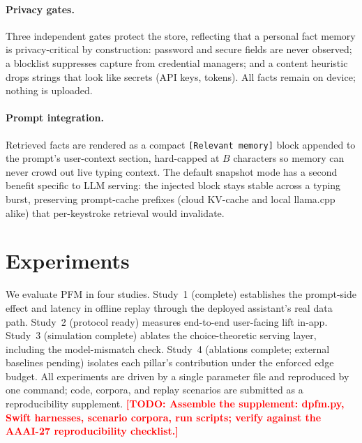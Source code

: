 \documentclass[letterpaper]{article}
\newcommand{\todo}[1]{\textbf{\textcolor{red}{[TODO: #1]}}}
\begin{document}
\paragraph{Privacy gates.}
Three independent gates protect the store, reflecting that a personal
fact memory is privacy-critical by construction: password and secure
fields are never observed; a blocklist suppresses capture from credential
managers; and a content heuristic drops strings that look like secrets
(API keys, tokens). All facts remain on device; nothing is uploaded.

\paragraph{Prompt integration.}
Retrieved facts are rendered as a compact \texttt{[Relevant memory]}
block appended to the prompt's user-context section, hard-capped at $B$
characters so memory can never crowd out live typing context. The default
snapshot mode has a second benefit specific to LLM serving: the injected
block stays stable across a typing burst, preserving prompt-cache
prefixes (cloud KV-cache and local llama.cpp alike) that per-keystroke
retrieval would invalidate.

\section{Experiments}

We evaluate PFM in four studies. Study~1 (complete) establishes the
prompt-side effect and latency in offline replay through the deployed
assistant's real data path. Study~2 (protocol ready) measures end-to-end
user-facing lift in-app. Study~3 (simulation complete) ablates the
choice-theoretic serving layer, including the model-mismatch check.
Study~4 (ablations complete; external baselines pending) isolates each
pillar's contribution under the enforced edge budget. All experiments are
driven by a single parameter file and reproduced by one command; code,
corpora, and replay scenarios are submitted as a reproducibility
supplement.
\todo{Assemble the supplement: dpfm.py, Swift harnesses, scenario corpora,
run scripts; verify against the AAAI-27 reproducibility checklist.}
\end{document}
